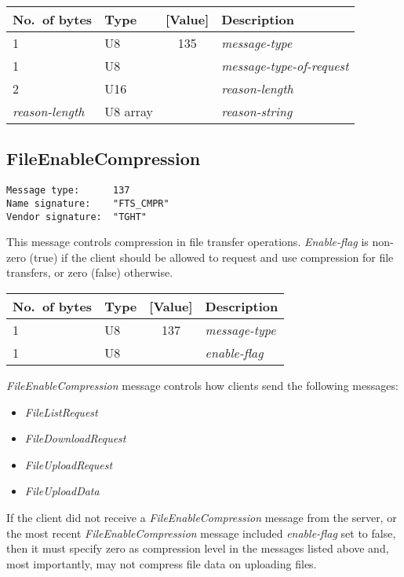\documentclass[a4paper]{article}
\newcommand{\typestr}[1]{\textit{#1}}
\begin{document}
\begin{tabular}{l|lc|l} \hline
No.\ of bytes & Type & [Value] & Description \\ \hline
1 & U8  & 135 & \typestr{message-type} \\
1 & U8  &     & \typestr{message-type-of-request} \\
2 & U16 &     & \typestr{reason-length} \\
\typestr{reason-length} & U8 array & & \typestr{reason-string} \\
\hline\end{tabular}


\newpage
\subsection{FileEnableCompression}
\begin{verbatim}
Message type:      137
Name signature:    "FTS_CMPR"
Vendor signature:  "TGHT"
\end{verbatim}

This message controls compression in file transfer operations.
\typestr{Enable-flag} is non-zero (true) if the client should be
allowed to request and use compression for file transfers, or zero
(false) otherwise.

\begin{tabular}{l|lc|l} \hline
No.\ of bytes & Type & [Value] & Description \\ \hline
1 & U8  & 137 & \typestr{message-type} \\
1 & U8  &     & \typestr{enable-flag} \\
\hline\end{tabular}

\typestr{FileEnableCompression} message controls how clients send the
following messages:

\begin{itemize}
\item \typestr{FileListRequest}
\item \typestr{FileDownloadRequest}
\item \typestr{FileUploadRequest}
\item \typestr{FileUploadData}
\end{itemize}

If the client did not receive a \typestr{FileEnableCompression}
message from the server, or the most recent
\typestr{FileEnableCompression} message included \typestr{enable-flag}
set to false, then it must specify zero as compression level in the
messages listed above and, most importantly, may not compress file
data on uploading files.
\end{document}
